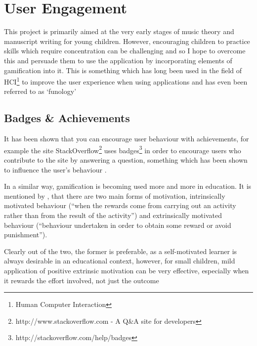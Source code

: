 \section{User Engagement}
\label{section:engagement}

This project is primarily aimed at the very early stages of music theory and manuscript writing for young children. However, encouraging children to practice skills which require concentration can be challenging and so I hope to overcome this and persuade them to use the application by incorporating elements of gamification into it. This is something which has long been used in the field of HCI\footnote{Human Computer Interaction} to improve the user experience when using applications and has even been referred to as `funology' \parencite{blythe2004funology}

\subsection*{Badges \& Achievements}
It has been shown that you can encourage user behaviour with achievements, for example the site StackOverflow\footnote{http://www.stackoverflow.com - A Q\&A site for developers} uses badges\footnote{http://stackoverflow.com/help/badges} in order to encourage users who contribute to the site by answering a question, something which has been shown to influence the user's behaviour \parencite{MSR13p65}.

In a similar way, gamification is becoming used more and more in education. It is mentioned by \citeauthor{kapp2012gamification}\cite{kapp2012gamification}, that there are two main forms of motivation, intrinsically motivated behaviour (\enquote{when the rewards come from carrying out an activity rather than from the result of the activity}) and extrinsically motivated behaviour (\enquote{behaviour undertaken in order to obtain some reward or avoid punishment}).

Clearly out of the two, the former is preferable, as a self-motivated learner is always desirable in an educational context, however, for small children, mild application of positive extrinsic motivation can be very effective, especially when it rewards the effort involved, not just the outcome \parencite{motivate-kids-lifehacker}\cite{motivate-kids-lifehacker}
